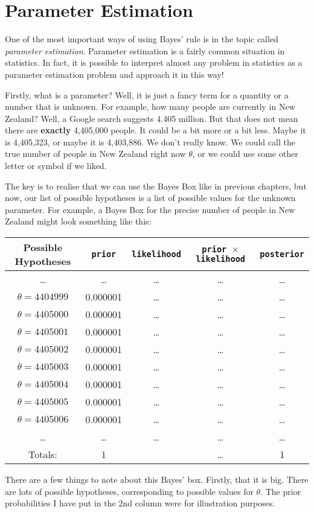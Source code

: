 \chapter{Parameter Estimation}
One of the most important ways of using Bayes' rule is in the topic
called {\it parameter estimation}. Parameter estimation is a fairly common
situation in statistics. In fact, it is possible to interpret almost any
problem in statistics as a parameter estimation problem and approach it
in this way!

Firstly, what is a parameter? Well, it is just a fancy term for a quantity or
a number that is unknown. For example, how many people are currently in New
Zealand? Well, a Google search suggests 4.405 million. But that does not mean
there are {\bf exactly} 4,405,000 people. It could be a bit more or a bit
less. Maybe it is 4,405,323, or maybe it is 4,403,886. We don't really know.
We could call the true number of people in New Zealand right now $\theta$, or
we could use some other letter or symbol if we liked.

The key is to realise that we can use the Bayes Box like in previous chapters,
but now, our list of possible hypotheses is a list of possible values for
the unknown parameter. For example, a Bayes Box for the precise number of
people in New Zealand might look something like this:
\begin{table}[h!]
\begin{center}
\begin{tabular}{|c|c|c|c|c|}
\hline
{\bf Possible Hypotheses} & {\tt prior} & {\tt likelihood} &
{\tt prior $\times$ likelihood} & {\tt posterior}\\
\hline
\ldots & \ldots & \ldots & \ldots & \ldots\\
$\theta = 4404999$ & 0.000001 & \ldots   & \ldots  & \ldots\\
$\theta = 4405000$ & 0.000001 & \ldots   & \ldots  & \ldots\\
$\theta = 4405001$ & 0.000001 & \ldots   & \ldots  & \ldots\\
$\theta = 4405002$ & 0.000001 & \ldots   & \ldots  & \ldots\\
$\theta = 4405003$ & 0.000001 & \ldots   & \ldots  & \ldots\\
$\theta = 4405004$ & 0.000001 & \ldots   & \ldots  & \ldots\\
$\theta = 4405005$ & 0.000001 & \ldots   & \ldots  & \ldots\\
$\theta = 4405006$ & 0.000001 & \ldots   & \ldots  & \ldots\\
\ldots & \ldots & \ldots & \ldots & \ldots\\
\hline
Totals: & 1 & & \ldots & 1\\
\hline
\end{tabular}
\end{center}
\end{table}
There are a few things to note about this Bayes' box. Firstly, that it is big.
There are lots of possible hypotheses, corresponding to possible values for
$\theta$. The prior probabilities I have put in the 2nd column were for
illustration purposes. 

